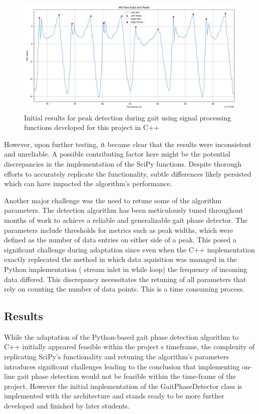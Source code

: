 \begin{figure}
    \centering
    \includegraphics[width=0.95\linewidth]{images/peaks_wz_13.12.24.png}
    \caption{Initial results for peak detection during gait using signal processing functions developed for this project in C++}
    \label{fig:peaks}
\end{figure}

However, upon further testing, it became clear that the results were inconsistent and unreliable. A possible contributing factor here might be the potential discrepancies in the implementation of the SciPy functions. Despite thorough efforts to accurately replicate the functionality, subtle differences likely persisted which can have impacted the algorithm's performance. 

Another major challenge was the need to retune some of the algorithm parameters. The detection algorithm has been meticulously tuned throughout months of work to achieve a reliable and generalizable gait phase detector. The parameters include thresholds for metrics such as peak widths, which were defined as the number of data entries on either side of a peak. This posed  a significant challenge during adaptation since even when the C++ implementation exactly replecated the method in which data aquisition was managed in the Python implementation ( stream inlet in while loop) the frequency of incoming data differed. This discrepancy necessitates the retuning of all parameters that rely on counting the number of data points. This is a time consuming process. 

\subsection{Results}
While the adaptation of the Python-based gait phase detection algorithm to C++ initially appeared feasible within the project
s timeframe, the complexity of replicating SciPy's functionality and retuning the algorithm's parameters introduces significant challenges leading to the conclusion that implementing on-line gait phase detection would not be feasible within the time-frame of the project. However the initial implementation of the GaitPhaseDetector class is implemented with the architecture and stands ready to be more further developed and finished by later students.



